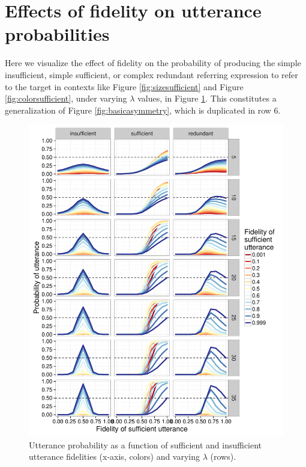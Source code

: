 \documentclass[11pt]{article}
\newcommand{\figref}[1]{Figure \ref{#1}}
\begin{document}
\appendix

\section{Effects of fidelity on utterance probabilities}
\label{app:modelexploration}

Here we visualize the effect of fidelity on the probability of producing the simple insufficient, simple sufficient, or complex redundant referring expression to refer to the target in contexts like  \figref{fig:sizesufficient} and \figref{fig:colorsufficient}, under varying $\lambda$ values, in \figref{fig:fullexploration}. This constitutes a generalization of \figref{fig:basicasymmetry}, which is duplicated in row 6.

\begin{figure}
\includegraphics[width=\textwidth]{pics/modelexploration-fullfidelityeffect-unlogged-wide}
\caption{Utterance probability as a function of sufficient and insufficient utterance fidelities (x-axis, colors) and varying $\lambda$ (rows).}
\label{fig:fullexploration}
\end{figure}
\end{document}

